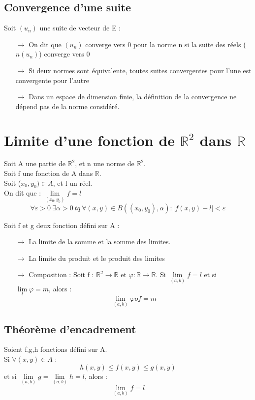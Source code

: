 \subsection{Convergence d'une suite}
Soit $(u_n)$ une suite de vecteur de E : 
\begin{itemize}
 \item[$\rightarrow$] On dit que $(u_n)$ converge vers 0 pour la norme n si la suite des réels ($n(u_n)$) converge vers 0
 \item[$\rightarrow$] Si deux normes sont équivalente, toutes suites convergentes pour l'une est convergente pour l'autre
 \item[$\rightarrow$] Dans un espace de dimension finie, la définition de la convergence ne dépend pas de la norme considéré.
\end{itemize}
\section{Limite d'une fonction de $\mathbb{R}^2$ dans $\mathbb{R}$}
\begin{de}
Soit A une partie de $\mathbb{R}^2$, et n une norme de $\mathbb{R}^2.$\\
Soit f une fonction de A dans $\mathbb{R}$.\\
Soit ($x_0,y_0) \in A$, et l un réel.\\
On dit que : $\underset{(x_0,y_0)}\lim f = l$
$$\forall \varepsilon > 0~ \exists \alpha > 0~ tq~ \forall (x,y) \in B((x_0,y_0),\alpha) : |f(x,y) - l| < \varepsilon$$
\end{de}
\begin{prop}
Soit f et g deux fonction défini sur A : 
\begin{itemize}
 \item[$\rightarrow$] La limite de la somme et la somme des limites.
 \item[$\rightarrow$] La limite du produit et le produit des limites
 \item[$\rightarrow$] Composition : Soit f : $\mathbb{R}^2 \rightarrow \mathbb{R}$ et $\varphi : \mathbb{R} \rightarrow \mathbb{R}$. Si $\underset{(a,b)}\lim f = l$ et si $\underset{l}\lim \varphi = m$, alors : $$\underset{(a,b)}\lim \varphi o f = m$$
\end{itemize}
\end{prop}
\subsection{Théorème d'encadrement}
Soient f,g,h fonctions défini sur A.\\ Si $\forall(x,y) \in A$ : 
$$h(x,y) \leq f(x,y) \leq g(x,y)$$
et si $\underset{(a,b)}\lim g = \underset{(a,b)}\lim h = l$, alors : 
$$\underset{(a,b)}\lim f = l$$
